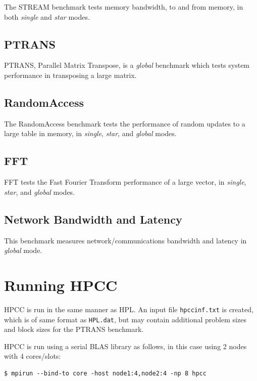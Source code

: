\documentclass{report}
\begin{document}
The STREAM benchmark tests memory bandwidth, to and from memory, in both \emph{single} and \emph{star} modes.


%
%
\subsection{PTRANS}

PTRANS, Parallel Matrix Transpose, is a \emph{global} benchmark which tests system performance in transposing a large matrix.


%
%
\subsection{RandomAccess}

The RandomAccess benchmark tests the performance of random updates to a large table in memory, in \emph{single}, \emph{star}, and \emph{global} modes.


%
%
\subsection{FFT}

FFT tests the Fast Fourier Transform performance of a large vector, in \emph{single}, \emph{star}, and \emph{global} modes.


%
%
\subsection{Network Bandwidth and Latency}

This benchmark measures network/communications bandwidth and latency in \emph{global} mode.


%
%
\section{Running HPCC}

HPCC is run in the same manner as HPL. An input file \verb|hpccinf.txt| is created, which is of same format as \verb|HPL.dat|, but may contain additional problem sizes and block sizes for the PTRANS benchmark.

HPCC is run using a serial BLAS library as follows, in this case using 2 nodes with 4 cores/slots:

\lstset{style=type}
\begin{lstlisting}
$ mpirun --bind-to core -host node1:4,node2:4 -np 8 hpcc
\end{lstlisting}
\end{document}
